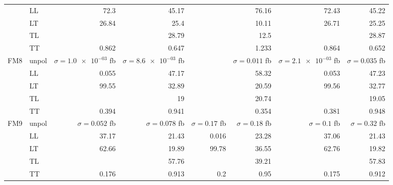 \begin{table}[h]
{\begin{tabular}{llrrrrrr}
 & LL & \num{72.3} & \num{45.17} &  & \num{76.16} & \num{72.43} & \num{45.22} \\
 & LT & \num{26.84} & \num{25.4} &  & \num{10.11} & \num{26.71} & \num{25.25} \\
 & TL &  & \num{28.79} &  & \num{12.5} &  & \num{28.87} \\
 & TT & \num{0.862} & \num{0.647} &  & \num{1.233} & \num{0.864} & \num{0.652} \\
\midrule
\multirow{5}{*}{FM8}
 & unpol & $\sigma = \num{1.0e-03}$ fb & $\sigma = \num{8.6e-03}$ fb &  & $\sigma = \num{0.011}$ fb & $\sigma = \num{2.1e-03}$ fb & $\sigma = \num{0.035}$ fb \\
 & LL & \num{0.055} & \num{47.17} &  & \num{58.32} & \num{0.053} & \num{47.23} \\
 & LT & \num{99.55} & \num{32.89} &  & \num{20.59} & \num{99.56} & \num{32.77} \\
 & TL &  & \num{19} &  & \num{20.74} &  & \num{19.05} \\
 & TT & \num{0.394} & \num{0.941} &  & \num{0.354} & \num{0.381} & \num{0.948} \\
\midrule
\multirow{5}{*}{FM9}
 & unpol & $\sigma = \num{0.052}$ fb & $\sigma = \num{0.078}$ fb & $\sigma = \num{0.17}$ fb & $\sigma = \num{0.18}$ fb & $\sigma = \num{0.1}$ fb & $\sigma = \num{0.32}$ fb \\
 & LL & \num{37.17} & \num{21.43} & \num{0.016} & \num{23.28} & \num{37.06} & \num{21.43} \\
 & LT & \num{62.66} & \num{19.89} & \num{99.78} & \num{36.55} & \num{62.76} & \num{19.82} \\
 & TL &  & \num{57.76} &  & \num{39.21} &  & \num{57.83} \\
 & TT & \num{0.176} & \num{0.913} & \num{0.2} & \num{0.95} & \num{0.175} & \num{0.912} \\
\bottomrule
\end{tabular}
}%
\end{table}
\newpage
